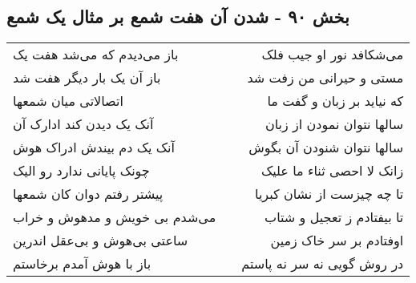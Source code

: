 \begin{center}
\section*{بخش ۹۰ - شدن آن هفت شمع بر مثال یک شمع}
\label{sec:sh090}
\begin{longtable}{l p{0.5cm} r}
باز می‌دیدم که می‌شد هفت یک
&&
می‌شکافد نور او جیب فلک
\\
باز آن یک بار دیگر هفت شد
&&
مستی و حیرانی من زفت شد
\\
اتصالاتی میان شمعها
&&
که نیاید بر زبان و گفت ما
\\
آنک یک دیدن کند ادارک آن
&&
سالها نتوان نمودن از زبان
\\
آنک یک دم بیندش ادراک هوش
&&
سالها نتوان شنودن آن بگوش
\\
چونک پایانی ندارد رو الیک
&&
زانک لا احصی ثناء ما علیک
\\
پیشتر رفتم دوان کان شمعها
&&
تا چه چیزست از نشان کبریا
\\
می‌شدم بی خویش و مدهوش و خراب
&&
تا بیفتادم ز تعجیل و شتاب
\\
ساعتی بی‌هوش و بی‌عقل اندرین
&&
اوفتادم بر سر خاک زمین
\\
باز با هوش آمدم برخاستم
&&
در روش گویی نه سر نه پاستم
\\
\end{longtable}
\end{center}
